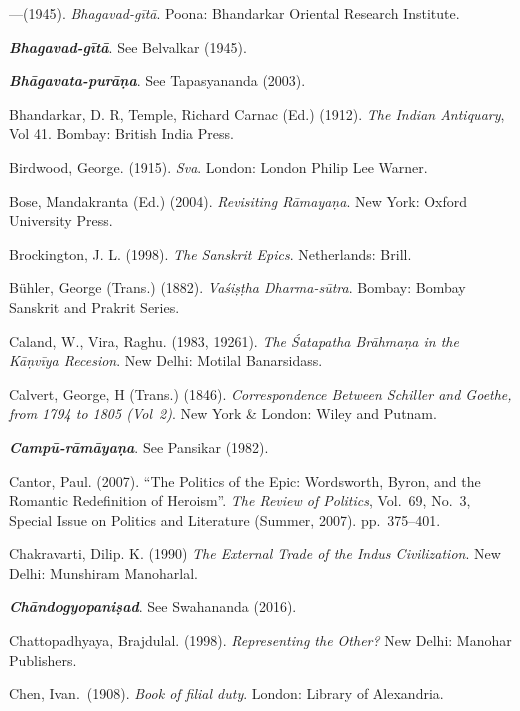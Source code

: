 \begin{thebibliography}{99}
---\kern3pt(1945). {\sl Bhagavad-gītā}. Poona: Bhandarkar Oriental Research Institute. 

{\sl\bfseries Bhagavad-gītā}. See Belvalkar (1945).

{\sl\bfseries Bhāgavata-purāṇa}. See Tapasyananda (2003). 

Bhandarkar, D. R, Temple, Richard Carnac (Ed.) (1912). {\sl The Indian Antiquary}, Vol 41. Bombay: British India Press. 

Birdwood, George. (1915). {\sl Sva}. London: London Philip Lee Warner. 

Bose, Mandakranta (Ed.) (2004). {\sl Revisiting Rāmayaṇa}. New York: Oxford University Press.

Brockington, J. L. (1998). {\sl The Sanskrit Epics}. Netherlands: Brill.

Bühler, George (Trans.) (1882). {\sl Vaśiṣṭha Dharma-sūtra}. Bombay: Bombay Sanskrit and Prakrit Series. 

Caland, W., Vira, Raghu. (1983, 19261). {\sl The Śatapatha Brāhmaṇa in the Kāṇvīya Recesion}. New Delhi: Motilal Banarsidass. 

Calvert, George, H (Trans.) (1846). {\sl Correspondence Between Schiller and Goethe, from 1794 to 1805 (Vol~2)}. New York \& London: Wiley and Putnam.  

{\sl\bfseries Campū-rāmāyaṇa}. See Pansikar (1982).

Cantor, Paul. (2007). “The Politics of the Epic: Wordsworth, Byron, and the Romantic Redefinition of Heroism”. {\sl The Review of Politics}, Vol.~69, No.~3, Special Issue on Politics and Literature (Summer, 2007). pp.~375--401.

Chakravarti, Dilip. K. (1990) {\sl The External Trade of the Indus Civilization}. New Delhi: Munshiram Manoharlal. 

{\sl\bfseries Chāndogyopaniṣad}. See Swahananda (2016).

Chattopadhyaya, Brajdulal. (1998). {\sl Representing the Other?} New Delhi: Manohar Publishers. 

Chen, Ivan.\ (1908). {\sl Book of filial duty}. London: Library of Alexandria. 


\end{thebibliography}
